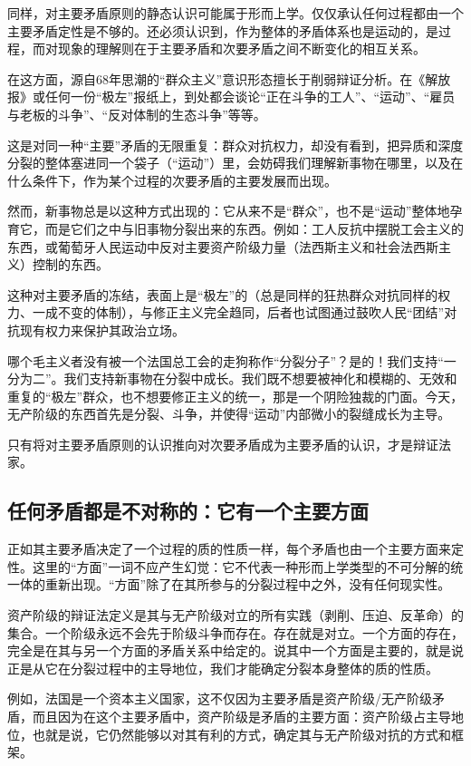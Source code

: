 \documentclass[fontset=fandol, a4paper, 12pt, twoside]{ctexart}
\begin{document}
同样，对主要矛盾原则的静态认识可能属于形而上学。仅仅承认任何过程都由一个主要矛盾定性是不够的。还必须认识到，作为整体的矛盾体系也是运动的，是过程，而对现象的理解则在于主要矛盾和次要矛盾之间不断变化的相互关系。

在这方面，源自68年思潮的“群众主义”意识形态擅长于削弱辩证分析。在《解放报》或任何一份“极左”报纸上，到处都会谈论“正在斗争的工人”、“运动”、“雇员与老板的斗争”、“反对体制的生态斗争”等等。

这是对同一种“主要”矛盾的无限重复：群众对抗权力，却没有看到，把异质和深度分裂的整体塞进同一个袋子（“运动”）里，会妨碍我们理解新事物在哪里，以及在什么条件下，作为某个过程的次要矛盾的主要发展而出现。

然而，新事物总是以这种方式出现的：它从来不是“群众”，也不是“运动”整体地孕育它，而是它们之中与旧事物分裂出来的东西。例如：工人反抗中摆脱工会主义的东西，或葡萄牙人民运动中反对主要资产阶级力量（法西斯主义和社会法西斯主义）控制的东西。

这种对主要矛盾的冻结，表面上是“极左”的（总是同样的狂热群众对抗同样的权力、一成不变的体制），与修正主义完全趋同，后者也试图通过鼓吹人民“团结”对抗现有权力来保护其政治立场。

哪个毛主义者没有被一个法国总工会的走狗称作“分裂分子”？是的！我们支持“一分为二”。我们支持新事物在分裂中成长。我们既不想要被神化和模糊的、无效和重复的“极左”群众，也不想要修正主义的统一，那是一个阴险独裁的门面。今天，无产阶级的东西首先是分裂、斗争，并使得“运动”内部微小的裂缝成长为主导。

只有将对主要矛盾原则的认识推向对次要矛盾成为主要矛盾的认识，才是辩证法家。

\subsection{任何矛盾都是不对称的：它有一个主要方面}

正如其主要矛盾决定了一个过程的质的性质一样，每个矛盾也由一个主要方面来定性。这里的“方面”一词不应产生幻觉：它不代表一种形而上学类型的不可分解的统一体的重新出现。“方面”除了在其所参与的分裂过程中之外，没有任何现实性。

资产阶级的辩证法定义是其与无产阶级对立的所有实践（剥削、压迫、反革命）的集合。一个阶级永远不会先于阶级斗争而存在。存在就是对立。一个方面的存在，完全是在其与另一个方面的矛盾关系中给定的。说其中一个方面是主要的，就是说正是从它在分裂过程中的主导地位，我们才能确定分裂本身整体的质的性质。

例如，法国是一个资本主义国家，这不仅因为主要矛盾是资产阶级/无产阶级矛盾，而且因为在这个主要矛盾中，资产阶级是矛盾的主要方面：资产阶级占主导地位，也就是说，它仍然能够以对其有利的方式，确定其与无产阶级对抗的方式和框架。
\end{document}
